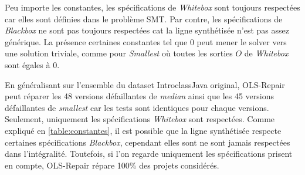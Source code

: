 \par Peu importe les constantes, les spécifications de \textit{Whitebox} sont toujours respectées car elles sont définies dans le problème SMT. Par contre, les spécifications de  \textit{Blackbox} ne sont pas toujours respectées cat la ligne synthétisée n'est pas assez générique. La présence certaines constantes tel que 0 peut mener le solver vers une solution triviale, comme pour \textit{Smallest} où toutes les sorties $O$ de \textit{Whitebox} sont égales à 0.

\newpage
En généralisant sur l'ensemble du dataset IntroclassJava original, OLS-Repair peut réparer les 48 versions défaillantes de \textit{median} ainsi que les 45 versions défaillantes de \textit{smallest} car les tests sont identiques pour chaque versions. Seulement, uniquement les spécifications \textit{Whitebox} sont respectées. Comme expliqué en \ref{table:constantes}, il est possible que la ligne synthétisée respecte certaines spécifications \textit{Blackbox}, cependant elles sont ne sont jamais respectées dans l'intégralité. Toutefois, si l'on regarde uniquement les spécifications prisent en compte, OLS-Repair répare 100\% des projets considérés.





